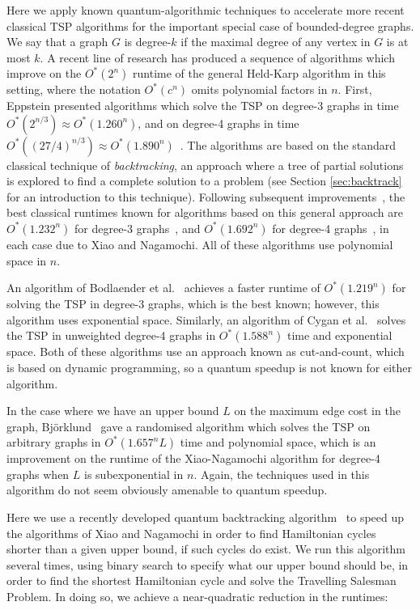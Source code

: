 Here we apply known quantum-algorithmic techniques to accelerate more recent classical TSP algorithms for the important special case of bounded-degree graphs. We say that a graph $G$ is degree-$k$ if the maximal degree of any vertex in $G$ is at most $k$. A recent line of research has produced a sequence of algorithms which improve on the $O^*(2^n)$ runtime of the general Held-Karp algorithm in this setting, where the notation $O^*(c^n)$ omits polynomial factors in $n$. First, Eppstein presented algorithms which solve the TSP on degree-3 graphs in time $O^*(2^{n/3}) \approx O^*(1.260^n)$, and on degree-4 graphs in time $O^*((27/4)^{n/3}) \approx O^*(1.890^n)$~\cite{eppstein2007}. The algorithms are based on the standard classical technique of {\em backtracking}, an approach where a tree of partial solutions is explored to find a complete solution to a problem (see Section \ref{sec:backtrack} for an introduction to this technique). Following subsequent improvements~\cite{iwama07,liskiewicz14}, the best classical runtimes known for algorithms based on this general approach are $O^*(1.232^n)$ for degree-3 graphs~\cite{xiao2016degree3}, and $O^*(1.692^n)$ for degree-4 graphs~\cite{xiao2016degree4}, in each case due to Xiao and Nagamochi. All of these algorithms use polynomial space in $n$.

An algorithm of Bodlaender et al.~\cite{bodlaender15} achieves a faster runtime of $O^*(1.219^n)$ for solving the TSP in degree-3 graphs, which is the best known; however, this algorithm uses exponential space. Similarly, an algorithm of Cygan et al.~\cite{cygan11} solves the TSP in unweighted degree-4 graphs in $O^*(1.588^n)$ time and exponential space. Both of these algorithms use an approach known as cut-and-count, which is based on dynamic programming, so a quantum speedup is not known for either algorithm.

In the case where we have an upper bound $L$ on the maximum edge cost in the graph, Bj\"orklund~\cite{bjorklund14} gave a randomised algorithm which solves the TSP on arbitrary graphs in $O^*(1.657^n L)$ time and polynomial space, which is an improvement on the runtime of the Xiao-Nagamochi algorithm for degree-4 graphs when $L$ is subexponential in $n$. Again, the techniques used in this algorithm do not seem obviously amenable to quantum speedup.

Here we use a recently developed quantum backtracking algorithm~\cite{montanaro2015} to speed up the algorithms of Xiao and Nagamochi in order to find Hamiltonian cycles shorter than a given upper bound, if such cycles do exist. We run this algorithm several times, using binary search to specify what our upper bound should be, in order to find the shortest Hamiltonian cycle and solve the Travelling Salesman Problem. In doing so, we achieve a near-quadratic reduction in the runtimes:

